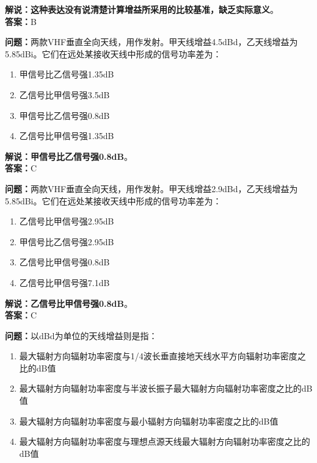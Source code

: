 \textbf{解说：这种表达没有说清楚计算增益所采用的比较基准，缺乏实际意义}。\\\textbf{答案：}B



\textbf{问题：}两款VHF垂直全向天线，用作发射。甲天线增益4.5dBd，乙天线增益为5.85dBi。它们在远处某接收天线中形成的信号功率差为：

\begin{enumerate}[label=\Alph*), leftmargin=1.5cm]
	\item 甲信号比乙信号强1.35dB
	\item 乙信号比甲信号强3.5dB
	\item 甲信号比乙信号强0.8dB
	\item 乙信号比甲信号强1.35dB
\end{enumerate}

\textbf{解说：甲信号比乙信号强0.8dB}。\\\textbf{答案：}C%



\textbf{问题：}两款VHF垂直全向天线，用作发射。甲天线增益2.9dBd，乙天线增益为5.85dBi。它们在远处某接收天线中形成的信号功率差为：

\begin{enumerate}[label=\Alph*), leftmargin=1.5cm]
	\item 乙信号比甲信号强2.95dB
	\item 甲信号比乙信号强2.95dB
	\item 乙信号比甲信号强0.8dB
	\item 乙信号比甲信号强7.1dB
\end{enumerate}

\textbf{解说：乙信号比甲信号强0.8dB}。\\\textbf{答案：}C%



\textbf{问题：}以dBd为单位的天线增益则是指：

\begin{enumerate}[label=\Alph*), leftmargin=1.5cm]
	\item 最大辐射方向辐射功率密度与1/4波长垂直接地天线水平方向辐射功率密度之比的dB值
	\item 最大辐射方向辐射功率密度与半波长振子最大辐射方向辐射功率密度之比的dB值
	\item 最大辐射方向辐射功率密度与最小辐射方向辐射功率密度之比的dB值
	
	\item 最大辐射方向辐射功率密度与理想点源天线最大辐射方向辐射功率密度之比的dB值
\end{enumerate}

